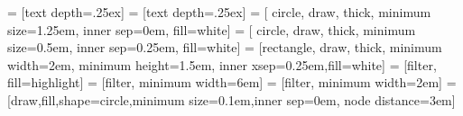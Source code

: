  = [text depth=.25ex]
 = [text depth=.25ex]
 = [ circle, draw, thick, minimum size=1.25em, inner sep=0em, fill=white]
 = [ circle, draw, thick, minimum size=0.5em, inner sep=0.25em, fill=white]
 = [rectangle, draw, thick, minimum width=2em, minimum height=1.5em, inner xsep=0.25em,fill=white]
 = [filter, fill=highlight]
 = [filter, minimum width=6em]
 = [filter, minimum width=2em]
 = [draw,fill,shape=circle,minimum size=0.1em,inner sep=0em, node distance=3em]

\newlength{\xunit}
\newlength{\yunit}
\makeatletter
{}